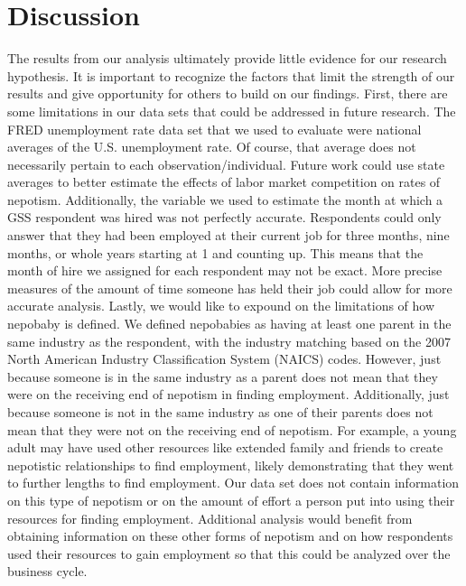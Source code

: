 \documentclass[12pt]{article}
\begin{document}
\section{Discussion}
\label{sec:discussion}
The results from our analysis ultimately provide little evidence for our research hypothesis. It is important to recognize the factors that limit the strength of our results and give opportunity for others to build on our findings. First, there are some limitations in our data sets that could be addressed in future research. The FRED unemployment rate data set that we used to evaluate were national averages of the U.S. unemployment rate. Of course, that average does not necessarily pertain to each observation/individual. Future work could use state averages to better estimate the effects of labor market competition on rates of nepotism. Additionally, the variable we used to estimate the month at which a GSS respondent was hired was not perfectly accurate. Respondents could only answer that they had been employed at their current job for three months, nine months, or whole years starting at 1 and counting up. This means that the month of hire we assigned for each respondent may not be exact. More precise measures of the amount of time someone has held their job could allow for more accurate analysis. Lastly, we would like to expound on the limitations of how nepobaby is defined. We defined nepobabies as having at least one parent in the same industry as the respondent, with the industry matching based on the 2007 North American Industry Classification System (NAICS) codes. However, just because someone is in the same industry as a parent does not mean that they were on the receiving end of nepotism in finding employment. Additionally, just because someone is not in the same industry as one of their parents does not mean that they were not on the receiving end of nepotism. For example, a young adult may have used other resources like extended family and friends to create nepotistic relationships to find employment, likely demonstrating that they went to further lengths to find employment. Our data set does not contain information on this type of nepotism or on the amount of effort a person put into using their resources for finding employment. Additional analysis would benefit from obtaining information on these other forms of nepotism and on how respondents used their resources to gain employment so that this could be analyzed over the business cycle.
\end{document}
